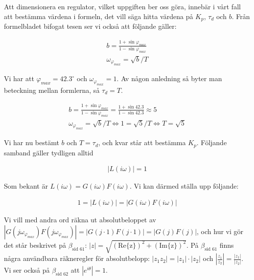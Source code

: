\documentclass[a4paper]{article}
\newcommand{\mhb}[1]{$\beta_{\text{#1}}$}     %
\newcommand{\oklarhet}[1]{%
  \noindent\fbox{\parbox[b][2em][t]{\textwidth}{\color{red}#1} }%
}
\begin{document}
Att dimensionera en regulator, vilket uppgiften ber oss göra, innebär i vårt fall att bestämma värdena i formeln, det vill säga hitta värdena på $K_p$, $\tau_d$ och $b$. Från formelbladet bifogat tesen ser vi också att följande gäller:

\begin{align*}
  b = \frac{1 + \sin \varphi_{max}}{1 - \sin \varphi_{max}}\\
  \omega_{\varphi_{max}} = \sqrt{b}/T
\end{align*}

Vi har att $\varphi_{max} = 42.3^\circ$ och $\omega_{\varphi_{max}} = 1$. Av någon anledning så byter man beteckning mellan formlerna, så $\tau_d = T$.\\
\oklarhet{Varför är $T = \tau_d$?}

\begin{align*}
  b = \frac{1 + \sin \varphi_{max}}{1 - \sin \varphi_{max}} = \frac{1 + \sin 42.3}{1 - \sin 42.3} \approx 5\\
  \omega_{\varphi_{max}} = \sqrt{b}/T \Longleftrightarrow 1 = \sqrt{5}/T \Longleftrightarrow T = \sqrt{5}
\end{align*}

Vi har nu bestämt $b$ och $T = \tau_d$, och kvar står att bestämma $K_p$. Följande samband gäller tydligen alltid\\
\oklarhet{Referens?}

\begin{align*}
  |L(i\omega)| = 1
\end{align*}

Som bekant är $L(i\omega) = G(i\omega)F(i\omega)$. Vi kan därmed ställa upp följande:

\begin{align*}
  1 = |L(i\omega)| = |G(i\omega)F(i\omega)|
\end{align*}

Vi vill med andra ord räkna ut absolutbeloppet av $|G(j\omega_{\varphi_{max}})F(j\omega_{\varphi_{max}})| = |G(j\cdot1)F(j\cdot1)| = |G(j)F(j)|$, och hur vi gör det står beskrivet på \mhb{sid 61}: $|z| = \sqrt{(\text{Re\{z\}})^2 + (\text{Im\{z\}})^2}$. På \mhb{sid 61} finns några användbara räkneregler för absolutbelopp: $|z_1 z_2| = |z_1|\cdot |z_2|$ och $\left|\frac{z_1}{z_2}\right| = \frac{|z_1|}{|z_2|}$. Vi ser också på \mhb{sid 62} att $|e^{i\theta}| = 1$.
\end{document}
